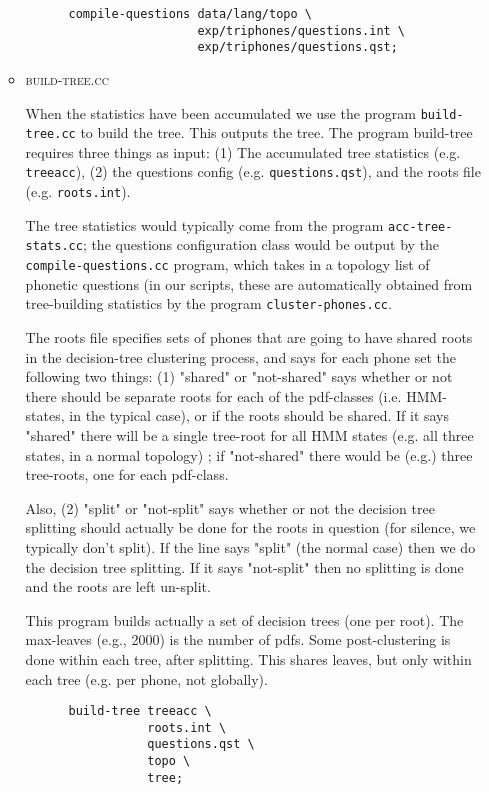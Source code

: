 \documentclass[10pt,a4paper]{article}
\begin{document}
\begin{itemize}
\begin{itemize}
    \begin{verbatim}
      compile-questions data/lang/topo \
                        exp/triphones/questions.int \
                        exp/triphones/questions.qst;
    \end{verbatim}

  \item \textsc{build-tree.cc}

    When the statistics have been accumulated we use the program \texttt{build-tree.cc} to build the tree. This outputs the tree. The program build-tree requires three things as input: (1) The accumulated tree statistics (e.g. \texttt{treeacc}), (2) the questions config (e.g. \texttt{questions.qst}), and the roots file (e.g. \texttt{roots.int}).

    The tree statistics would typically come from the program \texttt{acc-tree-stats.cc}; the questions configuration class would be output by the \texttt{compile-questions.cc} program, which takes in a topology list of phonetic questions (in our scripts, these are automatically obtained from tree-building statistics by the program \texttt{cluster-phones.cc}. 

    The roots file specifies sets of phones that are going to have shared roots in the decision-tree clustering process, and says for each phone set the following two things: (1) "shared" or "not-shared" says whether or not there should be separate roots for each of the pdf-classes (i.e. HMM-states, in the typical case), or if the roots should be shared. If it says "shared" there will be a single tree-root for all HMM states (e.g. all three states, in a normal topology) ; if "not-shared" there would be (e.g.) three tree-roots, one for each pdf-class. 

    Also, (2) "split" or "not-split" says whether or not the decision tree splitting should actually be done for the roots in question (for silence, we typically don't split). If the line says "split" (the normal case) then we do the decision tree splitting. If it says "not-split" then no splitting is done and the roots are left un-split.

    This program builds actually a set of decision trees (one per root). The max-leaves (e.g., 2000) is the number of pdfs. Some post-clustering is done within each tree, after splitting. This shares leaves, but only within each tree (e.g. per phone, not globally). 


    \begin{verbatim} 
      build-tree treeacc \
                 roots.int \
                 questions.qst \
                 topo \
                 tree;
    \end{verbatim}



\end{itemize}
\end{itemize}
\end{document}
